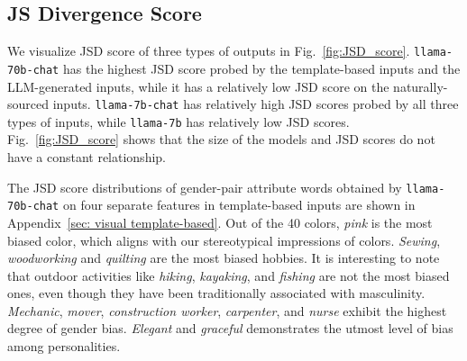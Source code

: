\documentclass{article}
\begin{document}
\subsection{JS Divergence Score}

We visualize JSD score of three types of outputs in Fig.~\ref{fig:JSD_score}. \texttt{llama-70b-chat} has the highest JSD score probed by the template-based inputs and the LLM-generated inputs, while it has a relatively low JSD score on the naturally-sourced inputs. \texttt{llama-7b-chat} has relatively high JSD scores probed by all three types of inputs, while \texttt{llama-7b} has relatively low JSD scores. Fig.~\ref{fig:JSD_score} shows that the size of the models and JSD scores do not have a constant relationship. 

The JSD score distributions of gender-pair attribute words obtained by \texttt{llama-70b-chat} on four separate features in template-based inputs are shown in 
Appendix~\ref{sec: visual template-based}.
Out of the 40 colors,
\textit{pink} is the most biased color, which aligns with our stereotypical impressions of colors.
\textit{Sewing}, \textit{woodworking} and \textit{quilting} are the most biased hobbies. It is interesting to note that outdoor activities like \textit{hiking}, \textit{kayaking}, and \textit{fishing} are not the most biased ones, even though they have been traditionally associated with masculinity. 
\textit{Mechanic}, \textit{mover}, \textit{construction worker}, \textit{carpenter}, and \textit{nurse} exhibit the highest degree of gender bias. 
\textit{Elegant} and \textit{graceful} demonstrates the utmost level of bias among personalities.
\end{document}
